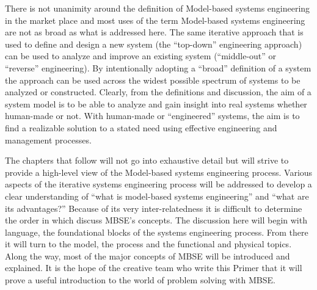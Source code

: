 There is not unanimity around the definition of Model-based systems engineering in the market place and most uses of the term Model-based systems engineering are not as broad as what is addressed here. The same iterative approach that is used to define and design a new system (the ``top-down'' engineering approach) can be used to analyze and improve an existing system (``middle-out'' or ``reverse'' engineering). By intentionally adopting a ``broad'' definition of a system the approach can be used across the widest possible spectrum of systems to be analyzed or constructed. Clearly, from the definitions and discussion, the aim of a system model is to be able to analyze and gain insight into real systems whether human-made or not. With human-made or ``engineered'' systems, the aim is to find a realizable solution to a stated need using effective engineering and management processes.

The chapters that follow will not go into exhaustive detail but will strive to provide a high-level view of the Model-based systems engineering process. Various aspects of the iterative systems engineering process will be addressed to develop a clear understanding of ``what is model-based systems engineering'' and ``what are its advantages?'' Because of its very inter-relatedness it is difficult to determine the order in which discuss MBSE’s concepts. The discussion here will begin with language, the foundational blocks of the systems engineering process. From there it will turn to the model, the process and the functional and physical topics. Along the way, most of the major concepts of MBSE will be introduced and explained. It is the hope of the creative team who write this Primer that it will prove a useful introduction to the world of problem solving with MBSE.


